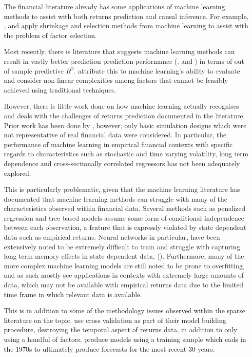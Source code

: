 \documentclass[11pt, a4paper, table]{article}
\begin{document}
The financial literature already has some applications of machine learning methods to assist with both returns prediction and causal inference. For example, \cite{kozak_shrinking_2017}, \cite{rapach_forecasting_2013} and \cite{freyberger_dissecting_2017} apply shrinkage and selection methods from machine learning to assist with the problem of factor selection.

Most recently, there is literature that suggests machine learning methods can result in vastly better prediction prediction performance (\cite{gu_empirical_2018}, \cite{hsu_finding_2014} and \cite{feng_deep_2018}) in terms of out of sample predictive $R^2$. \cite{gu_empirical_2018} attribute this to machine learning's ability to evaluate and consider non-linear complexities among factors that cannot be feasibly achieved using traditional techniques. 

However, there is little work done on how machine learning actually recognises and deals with the challenges of returns prediction documented in the literature. Prior work has been done by \cite{gu_empirical_2018}, however; only basic simulation designs which were not representative of real financial data were considered. In particular, the performance of machine learning in empirical financial contexts with specific regards to characteristics such as stochastic and time varying volatility, long term dependence and cross-sectionally correlated regressors has not been adequately explored. 

This is particularly problematic, given that the machine learning literature has documented that machine learning methods can struggle with many of the characteristics observed within financial data. Several methods such as penalized regression and tree based models assume some form of conditional independence between each observation, a feature that is expressly violated by state dependent data such as empirical returns. Neural networks in particular, have been extensively noted to be extremely difficult to train and struggle with capturing long term memory effects in state dependent data, (\cite{bengio_learning_1994}). Furthermore, many of the more complex machine learning models are still noted to be prone to overfitting, and as such mostly see applications in contexts with extremely large amounts of data, which may not be available with empirical returns data due to the limited time frame in which relevant data is available. 

This is in addition to some of the methodology issues observed within the sparse literature on the topic. \cite{feng_deep_2018} use cross validation as part of their model building procedure, destroying the temporal aspect of returns data, in addition to only using a handful of factors. \cite{gu_empirical_2018} produce models using a training sample which ends in the 1970s to ultimately produce forecasts for the most recent 30 years. 
\end{document}

